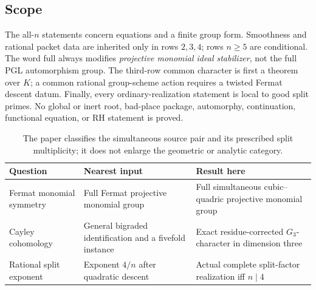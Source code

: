 \subsection*{Scope}

The all-\(n\) statements concern equations and a finite group form.
Smoothness and rational packet data are inherited only in rows \(2,3,4\);
rows \(n\ge5\) are conditional.  The word full always modifies
\emph{projective monomial ideal stabilizer}, not the full PGL automorphism
group.  The third-row common character is first a theorem over \(K\); a
common rational group-scheme action requires a twisted Fermat descent datum.
Finally, every ordinary-realization statement is local to good split primes.
No global or inert root, bad-place package, automorphy, continuation,
functional equation, or RH statement is proved.

\begin{table}[t]
\centering
\small
\begin{tabular}{@{}p{}p{}p{}@{}}
\toprule
Question & Nearest input & Result here \\
\midrule
Fermat monomial symmetry
& Full Fermat projective monomial group
& Full simultaneous cubic--quadric projective monomial group \\
Cayley cohomology
& General bigraded identification and a fivefold instance
& Exact residue-corrected \(G_3\)-character in dimension three \\
Rational split exponent
& Exponent \(4/n\) after quadratic descent
& Actual complete split-factor realization iff \(n\mid4\) \\
\bottomrule
\end{tabular}
\caption{The paper classifies the simultaneous source pair and its prescribed
split multiplicity; it does not enlarge the geometric or analytic category.}
\label{tab:position}
\end{table}
